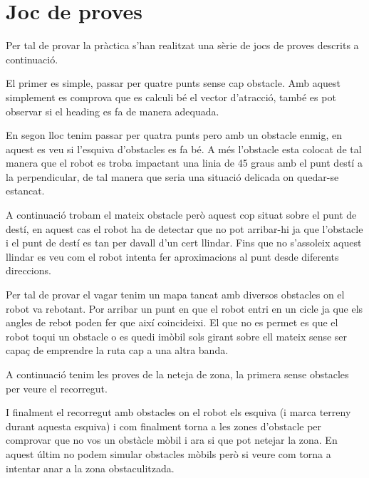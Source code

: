 \section{Joc de proves}

Per tal de provar la pràctica s'han realitzat una sèrie de jocs de proves
descrits a continuació.

El primer es simple, passar per quatre punts sense cap obstacle. Amb aquest simplement es comprova que es calculi
bé el vector d'atracció, també es pot observar si el heading es fa de manera adequada.

En segon lloc tenim passar per quatra punts pero amb un obstacle enmig, en aquest es veu si l'esquiva d'obstacles
es fa bé. A més l'obstacle esta colocat de tal manera que el robot es troba impactant una linia de 45 graus
amb el punt destí a la perpendicular, de tal manera que seria una situació delicada on quedar-se estancat.

A continuació trobam el mateix obstacle però aquest cop situat sobre el punt de destí, en aquest cas
el robot ha de detectar que no pot arribar-hi ja que l'obstacle i el punt de destí es tan per davall d'un cert
llindar. Fins que no s'assoleix aquest llindar es veu com el robot intenta fer aproximacions al punt desde
diferents direccions.

Per tal de provar el vagar tenim un mapa tancat amb diversos obstacles on el robot va rebotant.
Por arribar un punt en que el robot entri en un cicle ja que els angles de rebot poden fer que així
coincideixi. El que no es permet es que el robot toqui un obstacle o es quedi imòbil sols girant sobre
ell mateix sense ser capaç de emprendre la ruta cap a una altra banda.

A continuació tenim les proves de la neteja de zona, la primera sense obstacles per veure el recorregut.

I finalment el recorregut amb obstacles on el robot els esquiva (i marca terreny durant aquesta esquiva)
i com finalment torna a les zones d'obstacle per comprovar que no vos un obstàcle mòbil i ara si que
pot netejar la zona. En aquest últim no podem simular obstacles mòbils però si veure com torna a intentar
anar a la zona obstaculitzada.

